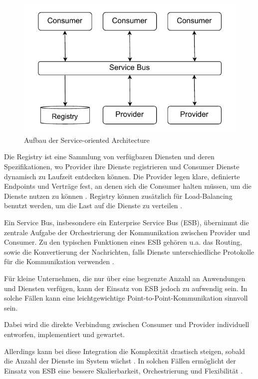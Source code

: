 \documentclass[acmtog]{acmart}
\begin{document}
\begin{figure}[!h]
  \centering
  \includegraphics[width=0.8\linewidth]{images/soa/soa.pdf}
  \caption{Aufbau der Service-oriented Architecture}
  \label{fig:soa}
\end{figure}

Die Registry ist eine Sammlung von verfügbaren Diensten und deren Spezifikationen, wo
Provider ihre Dienste registrieren und Consumer Dienste dynamisch zu Laufzeit entdecken können.
Die Provider legen klare, definierte Endpoints und Verträge fest, an denen sich die Consumer
halten müssen, um die Dienste nutzen zu können \cite[23 - 24]{soa4}.
Registry können zusätzlich für Load-Balancing benutzt werden, um die Last auf die Dienste zu verteilen \cite[23]{soa2}.

Ein Service Bus, insbesondere ein Enterprise Service Bus (ESB), übernimmt die zentrale
Aufgabe der Orchestrierung der Kommunikation zwischen Provider und Consumer.
Zu den typischen Funktionen eines ESB gehören u.a. das Routing, sowie die
Konvertierung der Nachrichten, falls Dienste unterschiedliche Protokolle für die Kommunikation verwenden \cite[37]{soa4}.

Für kleine Unternehmen, die nur über eine begrenzte Anzahl an Anwendungen und Diensten verfügen,
kann der Einsatz von ESB jedoch zu aufwendig sein.
In solche Fällen kann eine leichtgewichtige Point-to-Point-Kommunikation sinnvoll sein. \cite[21]{soa4}

Dabei wird die direkte Verbindung zwischen Consumer und Provider
individuell entworfen, implementiert und gewartet. \cite[19]{soa4}

Allerdings kann bei diese Integration die Komplexität drastisch steigen, sobald die Anzahl der Dienste im System wächst \cite[37]{soa4}.
In solchen Fällen ermöglicht der Einsatz von ESB eine bessere Skalierbarkeit, Orchestrierung und Flexibilität \cite[21]{soa2}.
\end{document}
